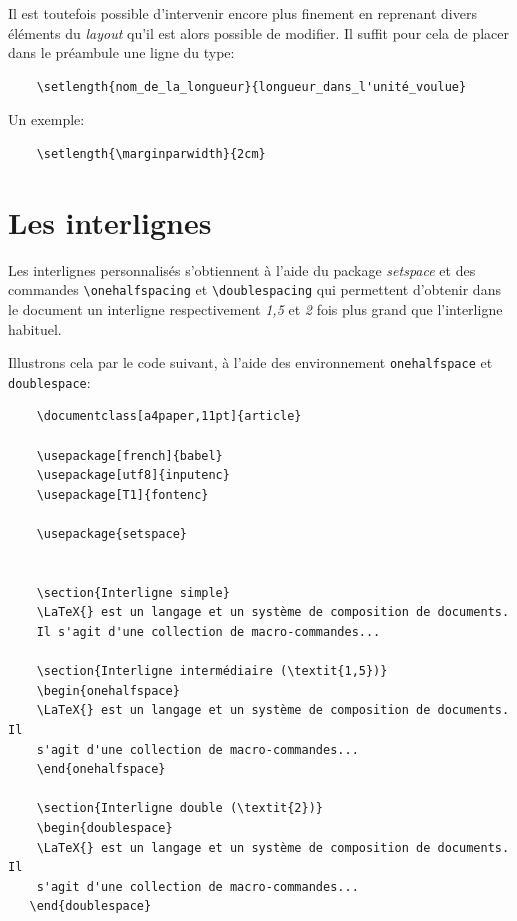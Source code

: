 Il est toutefois possible d'intervenir encore plus finement en reprenant divers éléments du \textit{layout} qu'il est alors possible de modifier. Il suffit pour cela de placer dans le préambule une ligne du type:
\begin{verbatim}
    \setlength{nom_de_la_longueur}{longueur_dans_l'unité_voulue}
\end{verbatim}
\medskip

Un exemple:
\begin{verbatim}
    \setlength{\marginparwidth}{2cm}
\end{verbatim}
\medskip

\section{Les interlignes}
Les interlignes personnalisés s'obtiennent à l'aide du package \textit{setspace} et des commandes \verb|\onehalfspacing| et \verb|\doublespacing| qui permettent d'obtenir dans le document un interligne respectivement \textit{1,5} et \textit{2} fois plus grand que l'interligne habituel.
\medskip

Illustrons cela par le code suivant, à l'aide des environnement \texttt{onehalfspace} et \texttt{doublespace}:
\begin{verbatim}
    \documentclass[a4paper,11pt]{article}

    \usepackage[french]{babel}
    \usepackage[utf8]{inputenc}
    \usepackage[T1]{fontenc}

    \usepackage{setspace}

    
    \section{Interligne simple}
    \LaTeX{} est un langage et un système de composition de documents. 
    Il s'agit d'une collection de macro-commandes...
    
    \section{Interligne intermédiaire (\textit{1,5})}
    \begin{onehalfspace}
    \LaTeX{} est un langage et un système de composition de documents. Il 
    s'agit d'une collection de macro-commandes... 
    \end{onehalfspace}

    \section{Interligne double (\textit{2})}
    \begin{doublespace}
    \LaTeX{} est un langage et un système de composition de documents. Il 
    s'agit d'une collection de macro-commandes...
   \end{doublespace}
   
\end{verbatim}
\medskip

